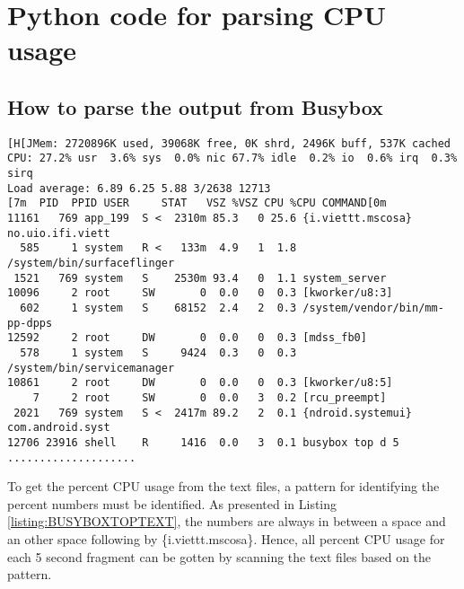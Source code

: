 
\chapter{Python code for parsing CPU usage} %
\label{AppendixC}
\section{How to parse the output from Busybox}
\begin{minipage}{\linewidth}
\begin{lstlisting}[caption={A sample of five seconds fragment output from the text file}, label = {listing:BUSYBOXTOPTEXT}, captionpos=b, basicstyle=\ttfamily\footnotesize]
[H[JMem: 2720896K used, 39068K free, 0K shrd, 2496K buff, 537K cached
CPU: 27.2% usr  3.6% sys  0.0% nic 67.7% idle  0.2% io  0.6% irq  0.3% sirq
Load average: 6.89 6.25 5.88 3/2638 12713
[7m  PID  PPID USER     STAT   VSZ %VSZ CPU %CPU COMMAND[0m
11161   769 app_199  S <  2310m 85.3   0 25.6 {i.viettt.mscosa} no.uio.ifi.viett
  585     1 system   R <   133m  4.9   1  1.8 /system/bin/surfaceflinger
 1521   769 system   S    2530m 93.4   0  1.1 system_server
10096     2 root     SW       0  0.0   0  0.3 [kworker/u8:3]
  602     1 system   S    68152  2.4   2  0.3 /system/vendor/bin/mm-pp-dpps
12592     2 root     DW       0  0.0   0  0.3 [mdss_fb0]
  578     1 system   S     9424  0.3   0  0.3 /system/bin/servicemanager
10861     2 root     DW       0  0.0   0  0.3 [kworker/u8:5]
    7     2 root     SW       0  0.0   3  0.2 [rcu_preempt]
 2021   769 system   S <  2417m 89.2   2  0.1 {ndroid.systemui} com.android.syst
12706 23916 shell    R     1416  0.0   3  0.1 busybox top d 5
....................
\end{lstlisting}
\end{minipage}
To get the percent CPU usage from the text files, a pattern for identifying the percent numbers must be identified. As presented in Listing \ref{listing:BUSYBOXTOPTEXT}, the numbers are always in between a space and an other space following by \{i.viettt.mscosa\}. Hence, all percent CPU usage for each 5 second fragment can be gotten by scanning the text files based on the pattern.
